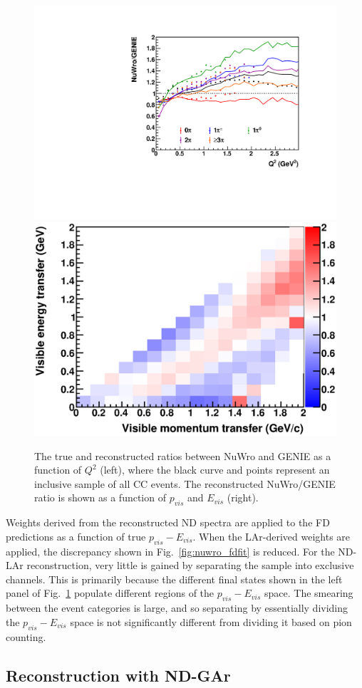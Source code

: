 \documentclass[11pt]{article}
\begin{document}
\begin{figure}[h]
\centering
\includegraphics[width=0.45\columnwidth]{graphics/LAr_TrueRecoRatios_Q2.pdf}
\includegraphics[width=0.45\columnwidth]{graphics/ratio_q0q3_all.eps}
\caption{The true and reconstructed ratios between NuWro and GENIE as a function of $Q^{2}$ (left), where the black curve and points represent an inclusive sample of all CC events. The reconstructed NuWro/GENIE ratio is shown as a function of $p_{vis}$ and $E_{vis}$ (right).}
\label{fig:lar_ratios}
\end{figure}

Weights derived from the reconstructed ND spectra are applied to the FD predictions as a function of true $p_{vis}-E_{vis}$. When the LAr-derived weights are applied, the discrepancy shown in Fig.~\ref{fig:nuwro_fdfit} is reduced. For the ND-LAr reconstruction, very little is gained by separating the sample into exclusive channels. This is primarily because the different final states shown in the left panel of Fig.~\ref{fig:lar_ratios} populate different regions of the $p_{vis}-E_{vis}$ space. The smearing between the event categories is large, and so separating by essentially dividing the $p_{vis}-E_{vis}$ space is not significantly different from dividing it based on pion counting.

\subsection{Reconstruction with ND-GAr}
\end{document}
